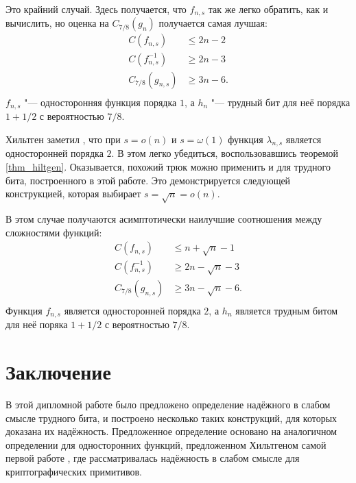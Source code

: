 \documentclass[a4paper, 14pt]{extarticle}
\begin{document}
\begin{construction}[$s = n - 1$.]
Это крайний случай. Здесь получается, что $f_{n, s}$ так же легко обратить, как
и вычислить, но оценка на $C_{7/8}(g_n)$ получается самая лучшая:
\[
\begin{aligned}
C(f_{n, s}) &\leq 2n - 2 \\
C(f_{n, s}^{-1}) &\geq 2n - 3 \\
C_{7/8}(g_{n, s}) &\geq 3n - 6. \\
\end{aligned}
\]
$f_{n,s}$ "--- односторонняя функция порядка $1$, а $h_{n}$ "--- трудный бит для
неё порядка $1 + 1/2$ с вероятностью $7/8$.
\end{construction}

Хильтген заметил \cite{hiltgen1993,hiltgen1994}, что при $s = o(n)$ и $s =
\omega(1)$ функция $\lambda_{n,s}$ является односторонней порядка $2$. В этом
легко убедиться, воспользовавшись теоремой \ref{thm_hiltgen}. Оказывается,
похожий трюк можно применить и для трудного бита, построенного в этой работе.
Это демонстрируется следующей конструкцией, которая выбирает $s = \sqrt n =
o(n)$.

\begin{construction}[$s = \sqrt{n}$.]
В этом случае получаются асимптотически наилучшие соотношения между сложностями
функций:
\[
\begin{aligned}
C(f_{n, s}) &\leq n + \sqrt{n} - 1 \\
C(f_{n, s}^{-1}) &\geq 2n - \sqrt n - 3 \\
C_{7/8}(g_{n, s}) &\geq 3n - \sqrt{n} - 6. \\
\end{aligned}
\]
Функция $f_{n, s}$ является односторонней порядка $2$, а $h_{n}$ является
трудным битом для неё поряка $1 + 1/2$ с вероятностью $7/8$.
\end{construction}

\section*{Заключение}
В этой дипломной работе было предложено определение надёжного в слабом смысле
трудного бита, и построено несколько таких конструкций, для которых доказана их
надёжность. Предложенное определение основано на аналогичном определении для
односторонних функций, предложенном Хильтгеном самой первой работе
\cite{hiltgen1993}, где рассматривалась надёжность в слабом смысле для
криптографических примитивов.
\end{document}
